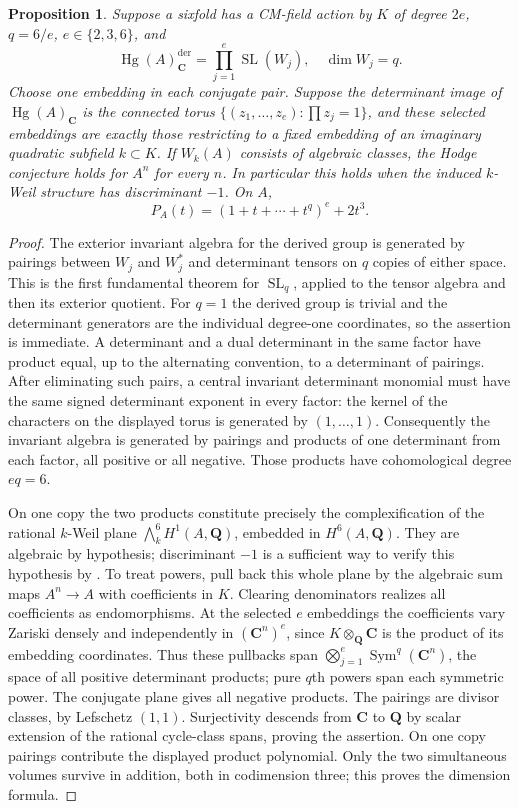 \documentclass[10pt,reqno]{article}
\theoremstyle{emphasizedplain}
\newtheorem{proposition}[theorem]{Proposition}
\theoremstyle{emphasizeddefinition}
\theoremstyle{emphasizeddefinition}
\DeclareMathOperator{\Hg}{Hg}
\DeclareMathOperator{\SL}{SL}
\DeclareMathOperator{\Sym}{Sym}
\newcommand{\Q}{\mathbf Q}
\newcommand{\C}{\mathbf C}
\newcommand{\dd}{\mathrm{der}}
\begin{document}
\begin{proposition}\label{p:coupled-det}
Suppose a sixfold has a CM-field action by $K$ of degree
$2e$, $q=6/e$, $e\in\{2,3,6\}$, and
\[
 \Hg(A)_\C^{\dd}=\prod_{j=1}^e\SL(W_j),\quad \dim W_j=q.
\]
Choose one embedding in each conjugate pair. Suppose the determinant
image of $\Hg(A)_\C$ is the connected torus
$\{(z_1,\ldots,z_e):\prod z_j=1\}$, and these selected embeddings are
exactly those restricting to a fixed embedding of an imaginary quadratic
subfield $k\subset K$. If $W_k(A)$ consists of algebraic classes,
the Hodge conjecture holds for $A^n$ for every $n$. In particular
this holds when the induced $k$-Weil structure has discriminant $-1$.
On $A$,
\[
 P_A(t)=(1+t+\cdots+t^q)^e+2t^3.
\]
\end{proposition}
\begin{proof}
The exterior invariant algebra for the derived group is generated by
pairings between $W_j$ and $W_j^*$ and determinant tensors on $q$ copies
of either space. This is the first fundamental theorem for $\SL_q$,
applied to the tensor algebra and then its exterior quotient. For $q=1$
the derived group is trivial and the determinant generators are the
individual degree-one coordinates, so the assertion is immediate. A determinant
and a dual determinant in the same factor have product equal, up to the
alternating convention, to a determinant of pairings. After eliminating
such pairs, a central invariant determinant monomial must have the same
signed determinant exponent in every factor: the kernel of the characters
on the displayed torus is generated by $(1,\ldots,1)$. Consequently the
invariant algebra is generated by pairings and products of one determinant
from each factor, all positive or all negative. Those products have
cohomological degree $eq=6$.

On one copy the two products constitute precisely the complexification
of the rational $k$-Weil plane $\bigwedge_k^6 H^1(A,\Q)$, embedded in
$H^6(A,\Q)$. They are algebraic by hypothesis; discriminant $-1$
is a sufficient way to verify this hypothesis by
\cite[Theorem 1.5.1]{Markman}. To treat powers, pull back this whole plane
by the algebraic sum maps $A^n\to A$ with coefficients in $K$. Clearing
denominators realizes all coefficients as endomorphisms. At the selected
$e$ embeddings the coefficients vary Zariski densely and independently
in $(\C^n)^e$, since $K\otimes_\Q\C$ is the product of its embedding
coordinates. Thus these pullbacks span
$\bigotimes_{j=1}^e\Sym^q(\C^n)$, the space of all positive determinant
products; pure $q$th powers span each symmetric power. The conjugate plane
gives all negative products. The pairings are divisor classes, by
Lefschetz $(1,1)$. Surjectivity descends from $\C$ to $\Q$ by scalar
extension of the rational cycle-class spans, proving the assertion.
On one copy pairings contribute the displayed product polynomial. Only
the two simultaneous volumes survive in addition, both in codimension
three; this proves the dimension formula.
\end{proof}
\end{document}
